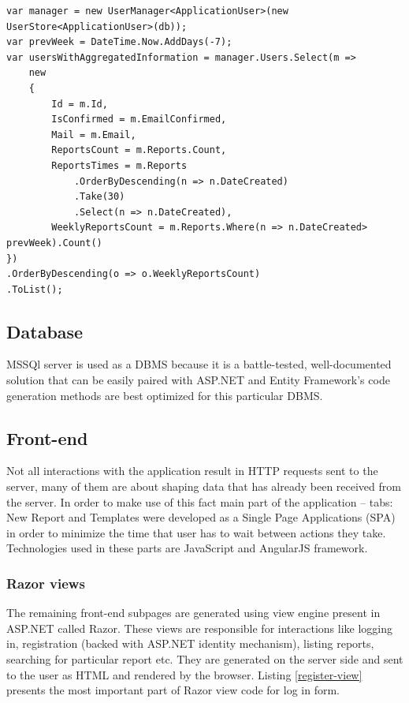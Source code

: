 \documentclass[12pt, twoside, openany]{report}
\theoremstyle{definition}
\begin{document}
\begin{lstlisting}[style=sharpc,caption=C\# code that is converted by Entity Framework to SQL sent to SQL Server \label{get-user-data}]
var manager = new UserManager<ApplicationUser>(new UserStore<ApplicationUser>(db));
var prevWeek = DateTime.Now.AddDays(-7);
var usersWithAggregatedInformation = manager.Users.Select(m =>
	new 
	{
		Id = m.Id,
		IsConfirmed = m.EmailConfirmed,
		Mail = m.Email,
		ReportsCount = m.Reports.Count,
		ReportsTimes = m.Reports
			.OrderByDescending(n => n.DateCreated)
			.Take(30)
			.Select(n => n.DateCreated),
		WeeklyReportsCount = m.Reports.Where(n => n.DateCreated> prevWeek).Count()
})
.OrderByDescending(o => o.WeeklyReportsCount)
.ToList();

\end{lstlisting}

\subsection{Database}
MSSQl server is used as a DBMS because it is a battle-tested, well-documented solution that can be easily paired with ASP.NET and Entity Framework's code generation methods are best optimized for this particular DBMS. 

\subsection{Front-end}
Not all interactions with the application result in HTTP requests sent to the server, many of them are about shaping data that has already been received from the server. In order to make use of this fact main part of the application -- tabs: New Report and Templates were developed as a Single Page Applications (SPA) in order to minimize the time that user has to wait between actions they take. Technologies used in these parts are JavaScript and AngularJS framework. 
\subsubsection{Razor views}
The remaining front-end subpages are generated using view engine present in ASP.NET called Razor. These views are responsible for interactions like logging in, registration (backed with ASP.NET identity mechanism), listing reports, searching for particular report etc. They are generated on the server side and sent to the user as HTML and rendered by the browser. Listing \ref{register-view} presents the most important part of Razor view code for log in form. 
\end{document}
